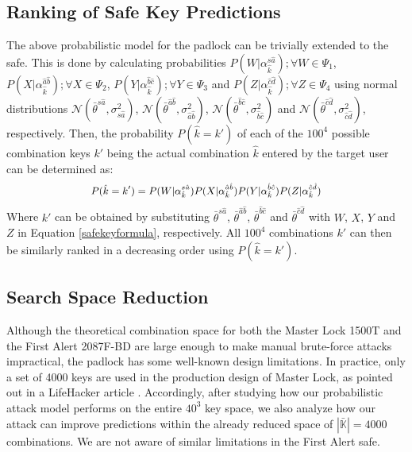 \documentclass[]{IEEEtran}
\begin{document}
\subsection{Ranking of Safe Key Predictions}
\label{probsafe}
The above probabilistic model for the padlock can be trivially extended to the safe. This is done by calculating probabilities $P(W|\alpha^{s\hat{a}}_{\hat{k}}); \forall W\in \Psi_1$, $P(X|\alpha^{\hat{a}\hat{b}}_{\hat{k}}); \forall X\in \Psi_2$, $P(Y|\alpha^{\hat{b}\hat{c}}_{\hat{k}}); \forall Y\in \Psi_3$ and $P(Z|\alpha^{\hat{c}\hat{d}}_{\hat{k}}); \forall Z\in \Psi_4$ using normal distributions $\mathcal{N}(\bar{\theta}^{s\hat{a}},\sigma^2_{s\hat{a}})$, $\mathcal{N}(\bar{\theta}^{\hat{a}\hat{b}},\sigma^2_{\hat{a}\hat{b}})$, $\mathcal{N}(\bar{\theta}^{\hat{b}\hat{c}},\sigma^2_{\hat{b}\hat{c}})$ and $\mathcal{N}(\bar{\theta}^{\hat{c}\hat{d}},\sigma^2_{\hat{c}\hat{d}})$, respectively.
Then, the probability $P(\hat{k}=k')$ of each of the $100^4$ possible combination keys $k'$ being the actual combination $\hat{k}$ entered by the target user can be determined as:
\begin{equation}
\small
\begin{aligned}
P(\hat{k}=k') = P(W|\alpha^{s\hat{a}}_{\hat{k}}) P(X|\alpha^{\hat{a}\hat{b}}_{\hat{k}}) P(Y|\alpha^{\hat{b}\hat{c}}_{\hat{k}}) P(Z|\alpha^{\hat{c}\hat{d}}_{\hat{k}})
\end{aligned}
\label{combinedprobsafe}
\end{equation}
Where $k'$ can be obtained by substituting $\bar{\theta}^{s\hat{a}}$, $\bar{\theta}^{\hat{a}\hat{b}}$, $\bar{\theta}^{\hat{b}\hat{c}}$ and $\bar{\theta}^{\hat{c}\hat{d}}$ with $W$, $X$, $Y$ and $Z$ in Equation \ref{safekeyformula}, respectively. 
All $100^4$ combinations $k'$ can then be similarly ranked in a decreasing order using $P(\hat{k}=k')$.

\subsection{Search Space Reduction}
\label{manufacturingflaws}
Although the theoretical combination space for both the Master Lock 1500T and the First Alert 2087F-BD are large enough to make manual brute-force attacks impractical, the padlock has some well-known design limitations. In practice, only a set of 4000 keys are used in the production design of Master Lock, as pointed out in a LifeHacker article \cite{lifehacker100}. Accordingly, after studying how our probabilistic attack model performs on the entire $40^3$ key space, we also analyze how our attack can improve predictions within the already reduced space of $|\mathbb{\bar{K}}|=4000$ combinations. We are not aware of similar limitations in the First Alert safe.
\end{document}
